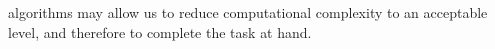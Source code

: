 algorithms may allow us to reduce computational complexity to an acceptable
level, and therefore to complete the task at hand.
%
%
%
%
%
%
% 
% 
% 
%
%
%

